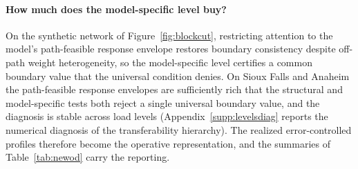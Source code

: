 \paragraph{How much does the model-specific level buy?}\label{sec:levelsdiag}
On the synthetic network of Figure~\ref{fig:blockcut}, restricting
attention to the model's path-feasible response envelope restores
boundary consistency despite off-path weight heterogeneity, so the
model-specific level certifies a common boundary value that the universal
condition denies. On Sioux Falls and Anaheim the path-feasible
response envelopes are sufficiently rich that the structural and
model-specific tests both reject a single universal boundary value,
and the diagnosis is stable across load levels
(Appendix~\ref{supp:levelsdiag} reports the numerical diagnosis of the
transferability hierarchy). The realized error-controlled profiles
therefore become the operative representation, and the summaries of
Table~\ref{tab:newod} carry the reporting.
